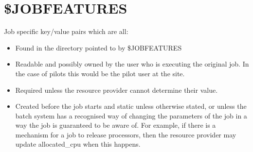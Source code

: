 \documentclass[12pt,a4paper]{article}
\begin{document}
\section{\$JOBFEATURES}
\label{sec:JOBFEATURES}

Job specific key/value pairs which are all:

\begin{itemize}
\item Found in the directory pointed to by \$JOBFEATURES
\item Readable and possibly owned by the user who is executing the original
      job. In the case of pilots this would be the pilot user at the site.
\item Required unless the resource provider cannot determine their value.
\item Created before the job starts and static unless otherwise stated, or 
      unless the batch system has a recognised way of changing the
      parameters of the job in a way the job is guaranteed to be aware
      of. For example, if there is a mechanism for a job to
      release processors, then the resource provider may update
      allocated\_cpu when this happens.
\end{itemize}
\end{document}
